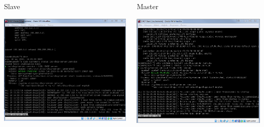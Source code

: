 \documentclass[presentation]{beamer}
\begin{document}
\begin{frame}[label={sec:orgec0b08a}]{}
\begin{columns}
\begin{column}{0.55\columnwidth}
\begin{block}{Slave}
\begin{center}
\includegraphics[width=.9\linewidth]{./data/dhcp/7_master.png}
\end{center}
\end{block}
\end{column}
\begin{column}{0.55\columnwidth}
\begin{block}{Master}
\begin{center}
\includegraphics[width=.9\linewidth]{./data/dhcp/7_slave.png}
\end{center}
\end{block}
\end{column}
\end{columns}
\end{frame}
\end{document}
